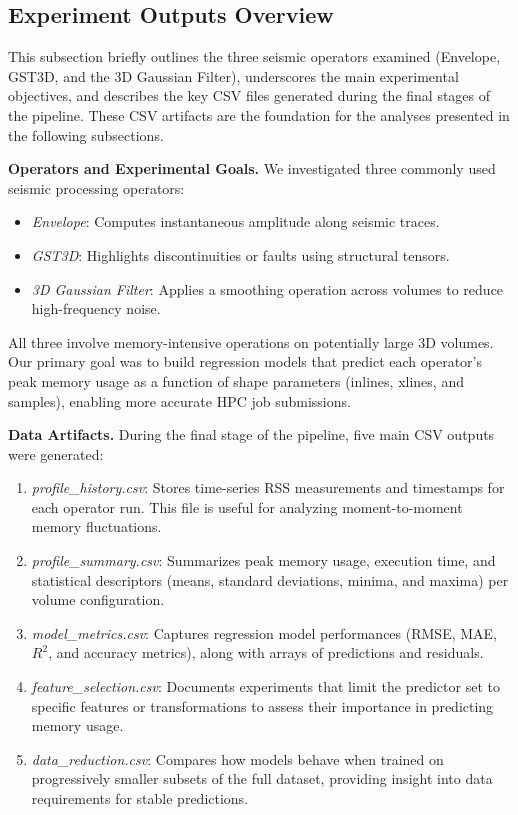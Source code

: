 \subsection{Experiment Outputs Overview}
\label{subsec:pmc-results-experiment-outputs-overview}

This subsection briefly outlines the three seismic operators examined (Envelope, \ac{GST3D}, and the 3D Gaussian Filter), underscores the main experimental objectives, and describes the key \ac{CSV} files generated during the final stages of the pipeline.
These \ac{CSV} artifacts are the foundation for the analyses presented in the following subsections.

\vspace{1em}
\noindent
\textbf{Operators and Experimental Goals.}
We investigated three commonly used seismic processing operators:
\begin{itemize}
    \item \emph{Envelope}: Computes instantaneous amplitude along seismic traces.
    \item \emph{\ac{GST3D}}: Highlights discontinuities or faults using structural tensors.
    \item \emph{3D Gaussian Filter}: Applies a smoothing operation across volumes to reduce high-frequency noise.
\end{itemize}
All three involve memory-intensive operations on potentially large \ac{3D} volumes.
Our primary goal was to build regression models that predict each operator’s peak memory usage as a function of shape parameters (inlines, xlines, and samples), enabling more accurate \ac{HPC} job submissions.

\vspace{1em}
\noindent
\textbf{Data Artifacts.}
During the final stage of the pipeline, five main \ac{CSV} outputs were generated:
\begin{enumerate}
    \item \emph{profile\_history.csv}: Stores time-series \ac{RSS} measurements and timestamps for each operator run. This file is useful for analyzing moment-to-moment memory fluctuations.
    \item \emph{profile\_summary.csv}: Summarizes peak memory usage, execution time, and statistical descriptors (means, standard deviations, minima, and maxima) per volume configuration.
    \item \emph{model\_metrics.csv}: Captures regression model performances (\ac{RMSE}, \ac{MAE}, $R^2$, and accuracy metrics), along with arrays of predictions and residuals.
    \item \emph{feature\_selection.csv}: Documents experiments that limit the predictor set to specific features or transformations to assess their importance in predicting memory usage.
    \item \emph{data\_reduction.csv}: Compares how models behave when trained on progressively smaller subsets of the full dataset, providing insight into data requirements for stable predictions.
\end{enumerate}

